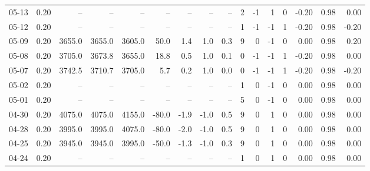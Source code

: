 \begin{threeparttable}
{\begin{tabular}{lrrrrrrrrrrrrrrr}
  05-13 &     0.20 &     -- &     -- &     -- &         -- &             -- &                       -- &                  -- &              2 &        -1 &     1 &         0 &      -0.20 &      0.98 &           0.00 \\
  05-12 &     0.20 &     -- &     -- &     -- &         -- &             -- &                       -- &                  -- &              1 &        -1 &    -1 &         1 &      -0.20 &      0.98 &          -0.20 \\
  05-09 &     0.20 & 3655.0 & 3655.0 & 3605.0 &       50.0 &            1.4 &                      1.0 &                 0.3 &              9 &         0 &    -1 &         0 &       0.00 &      0.98 &           0.20 \\
  05-08 &     0.20 & 3705.0 & 3673.8 & 3655.0 &       18.8 &            0.5 &                      1.0 &                 0.1 &              0 &        -1 &    -1 &         1 &      -0.20 &      0.98 &           0.00 \\
  05-07 &     0.20 & 3742.5 & 3710.7 & 3705.0 &        5.7 &            0.2 &                      1.0 &                 0.0 &              0 &        -1 &    -1 &         1 &      -0.20 &      0.98 &          -0.20 \\
  05-02 &     0.20 &     -- &     -- &     -- &         -- &             -- &                       -- &                  -- &              1 &         0 &    -1 &         0 &       0.00 &      0.98 &           0.00 \\
  05-01 &     0.20 &     -- &     -- &     -- &         -- &             -- &                       -- &                  -- &              5 &         0 &    -1 &         0 &       0.00 &      0.98 &           0.00 \\
  04-30 &     0.20 & 4075.0 & 4075.0 & 4155.0 &      -80.0 &           -1.9 &                     -1.0 &                 0.5 &              9 &         0 &     1 &         0 &       0.00 &      0.98 &           0.00 \\
  04-28 &     0.20 & 3995.0 & 3995.0 & 4075.0 &      -80.0 &           -2.0 &                     -1.0 &                 0.5 &              9 &         0 &     1 &         0 &       0.00 &      0.98 &           0.00 \\
  04-25 &     0.20 & 3945.0 & 3945.0 & 3995.0 &      -50.0 &           -1.3 &                     -1.0 &                 0.3 &              9 &         0 &     1 &         0 &       0.00 &      0.98 &           0.00 \\
  04-24 &     0.20 &     -- &     -- &     -- &         -- &             -- &                       -- &                  -- &              1 &         0 &     1 &         0 &       0.00 &      0.98 &           0.00 \\

\end{tabular}}
\end{threeparttable}
